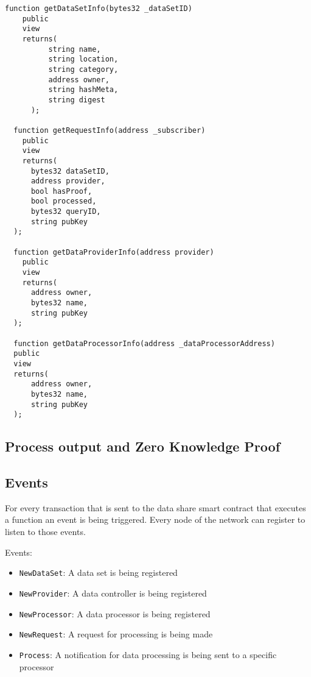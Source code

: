 \begin{lstlisting}[language=Solidity, caption={General functions}]
  function getDataSetInfo(bytes32 _dataSetID)
    public
    view
    returns(
          string name,
          string location,
          string category,
          address owner,
          string hashMeta,
          string digest
      );

  function getRequestInfo(address _subscriber)
    public
    view
    returns(
      bytes32 dataSetID,
      address provider,
      bool hasProof,
      bool processed,
      bytes32 queryID,
      string pubKey
  );

  function getDataProviderInfo(address provider)
    public
    view
    returns(
      address owner,
      bytes32 name,
      string pubKey
  );

  function getDataProcessorInfo(address _dataProcessorAddress)
  public
  view
  returns(
      address owner,
      bytes32 name,
      string pubKey
  );
\end{lstlisting}

\subsection{Process output and Zero Knowledge Proof}
\label{implemenation:contracts:zkp}

\subsection{Events}
\label{implemenation:contracts:events}

For every transaction that is sent to the data share smart contract that executes a function an event is being triggered. Every node of the network can register to listen to those events.

Events:

\begin{itemize}
  \item \verb|NewDataSet|: A data set is being registered
  \item \verb|NewProvider|: A data controller is being registered
  \item \verb|NewProcessor|: A data processor is being registered
  \item \verb|NewRequest|: A request for processing is being made
  \item \verb|Process|: A notification for data processing is being sent to a specific processor
\end{itemize}

